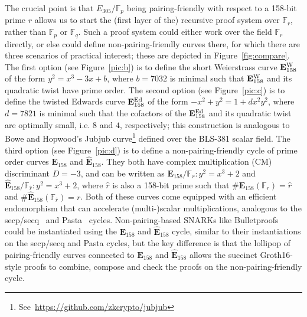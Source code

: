 \documentclass[version=preprint]{iacrcc}
\newcommand{\F}{\mathbb{F}}
\begin{document}
The crucial point is that $E_{305}/\F_p$ being pairing-friendly with respect to a 158-bit prime $r$ allows us to start the (first layer of the) recursive proof system over $\F_r$, rather than $\F_p$ or $\F_q$. Such a proof system could either work over the field $\F_r$ directly, or else could define non-pairing-friendly curves there, for which there are three scenarios of practical interest; these are depicted in Figure~\ref{fig:compare}. The first option (see Figure~\ref{pic:b}) is to define the short Weierstrass curve $\mathbf{E}_{158}^{\rm W}$ of the form $y^2=x^3-3x+b$, where $b=7032$ is minimal such that $\mathbf{E}_{158}^{\rm W}$ and its quadratic twist have prime order. The second option (see Figure~\ref{pic:c}) is to define the twisted Edwards curve $\mathbf{E}_{158}^{\rm Ed}$ of the form $-x^2+y^2=1+dx^2y^2$, where $d=7821$ is minimal such that the cofactors of the $\mathbf{E}_{158}^{\rm Ed}$ and its quadratic twist are optimally small, i.e. $8$ and $4$, respectively; this construction is analogous to Bowe and Hopwood's Jubjub curve\footnote{See~\url{https://github.com/zkcrypto/jubjub}} defined over the BLS-381 scalar field. The third option (see Figure~\ref{pic:d}) is to define a non-pairing-friendly cycle of prime order curves $\mathbf{E}_{158}$ and $\hat{\mathbf{E}}_{158}$. They both have complex multiplication (CM) discriminant $D=-3$, and can be written as 
$\mathbf{E}_{158}/\F_{r} \colon y^2=x^3+2$ and $\hat{\mathbf{E}}_{158}/\F_{\hat{r}} \colon y^2=x^3+2$, where $\hat{r}$ is also a 158-bit prime such that $\#\mathbf{E}_{158}(\F_r) = \hat{r}$ and $\#\hat{\mathbf{E}}_{158}(\F_{\hat{r}})=r$. Both of these curves come equipped with an efficient endomorphism that can accelerate (multi-)scalar multiplications, analogous to the secp/secq~\cite{secpsecq} and Pasta~\cite{pasta} cycles. Non-pairing-based SNARKs like Bulletproofs~\cite{bulletproofs} could be instantiated using the $\mathbf{E}_{158}$ and $\hat{\mathbf{E}}_{158}$ cycle, similar to their instantiations on the secp/secq and Pasta cycles, but the key difference is that the lollipop of pairing-friendly curves connected to $\mathbf{E}_{158}$ and $\hat{\mathbf{E}}_{158}$ allows the succinct {\sf Groth16}-style proofs to combine, compose and check the proofs on the non-pairing-friendly cycle. 
\end{document}
